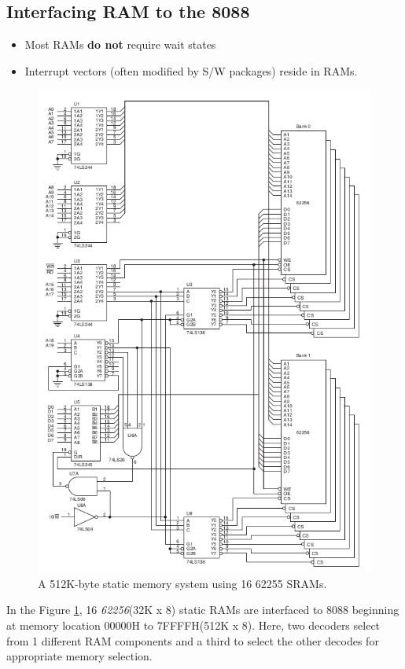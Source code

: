 \subsection{Interfacing RAM to the 8088}
\begin{itemize}
  \item Most RAMs \textbf{do not} require wait states
  \item Interrupt vectors (often modified by S/W packages) reside in RAMs.
  
\end{itemize}
\begin{figure}[h!]
  \includegraphics[width = 1\textwidth]{./figures/RAM.png}
  \caption{A 512K-byte static memory system using 16 62255 SRAMs.}
  \label{fig:ram}
\end{figure}
In the Figure \ref{fig:ram}, 16 \textit{62256}(32K x 8) static RAMs are interfaced to 8088 beginning at memory location 00000H to 7FFFFH(512K x 8). Here, two decoders select from 1 different RAM components and a third to select the other decodes for appropriate memory selection.
